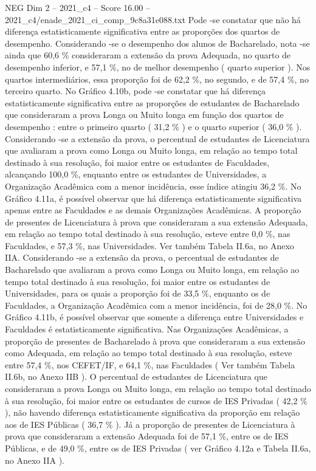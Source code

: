 \begin{textsample}{NEG Dim 2 – 2021\_c4 – Score 16.00 – 2021\_c4/enade\_2021\_ci\_comp\_9c8a31e088.txt}
Pode -se constatar que não há diferença estatisticamente significativa entre as proporções dos quartos de desempenho.
Considerando -se o desempenho dos alunos de Bacharelado, nota -se ainda que 60,6 \% consideraram a extensão da prova Adequada, no quarto de desempenho inferior, e 57,1 \%, no de melhor desempenho ( quarto superior ).
Nos quartos intermediários, essa proporção foi de 62,2 \%, no segundo, e de 57,4 \%, no terceiro quarto.
No Gráfico 4.10b, pode -se constatar que há diferença estatisticamente significativa entre as proporções de estudantes de Bacharelado que consideraram a prova Longa ou Muito longa em função dos quartos de desempenho : entre o primeiro quarto ( 31,2 \% ) e o quarto superior ( 36,0 \% ).
Considerando -se a extensão da prova, o percentual de estudantes de Licenciatura que avaliaram a prova como Longa ou Muito longa, em relação ao tempo total destinado à sua resolução, foi maior entre os estudantes de Faculdades, alcançando 100,0 \%, enquanto entre os estudantes de Universidades, a Organização Acadêmica com a menor incidência, esse índice atingiu 36,2 \%.
No Gráfico 4.11a, é possível observar que há diferença estatisticamente significativa apenas entre as Faculdades e as demais Organizações Acadêmicas.
A proporção de presentes de Licenciatura à prova que consideraram a sua extensão Adequada, em relação ao tempo total destinado à sua resolução, esteve entre 0,0 \%, nas Faculdades, e 57,3 \%, nas Universidades.
Ver também Tabela II.6a, no Anexo IIA.
Considerando -se a extensão da prova, o percentual de estudantes de Bacharelado que avaliaram a prova como Longa ou Muito longa, em relação ao tempo total destinado à sua resolução, foi maior entre os estudantes de Universidades, para os quais a proporção foi de 33,5 \%, enquanto os de Faculdades, a Organização Acadêmica com a menor incidência, foi de 28,0 \%.
No Gráfico 4.11b, é possível observar que somente a diferença entre Universidades e Faculdades é estatisticamente significativa.
Nas Organizações Acadêmicas, a proporção de presentes de Bacharelado à prova que consideraram a sua extensão como Adequada, em relação ao tempo total destinado à sua resolução, esteve entre 57,4 \%, nos CEFET/IF, e 64,1 \%, nas Faculdades ( Ver também Tabela II.6b, no Anexo IIB ).
O percentual de estudantes de Licenciatura que consideraram a prova Longa ou Muito longa, em relação ao tempo total destinado à sua resolução, foi maior entre os estudantes de cursos de IES Privadas ( 42,2 \% ), não havendo diferença estatisticamente significativa da proporção em relação aos de IES Públicas ( 36,7 \% ).
Já a proporção de presentes de Licenciatura à prova que consideraram a extensão Adequada foi de 57,1 \%, entre os de IES Públicas, e de 49,0 \%, entre os de IES Privadas ( ver Gráfico 4.12a e Tabela II.6a, no Anexo IIA ).

\end{textsample}
